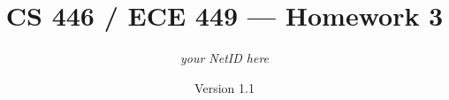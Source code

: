 \def\SPAN{\textup{span}}
\def\tu{\textup{u}}
\def\R{\mathbb{R}}
\def\E{\mathbb{E}}
\def\Z{\mathbb{Z}}
\def\be{\mathbf{e}}
\def\nf{\nabla f}
\def\veps{\varepsilon}
\def\cl{\textup{cl}}
\def\inte{\textup{int}}
\def\dom{\textup{dom}}
\def\Rad{\textup{Rad}}
\def\lsq{\ell_{\textup{sq}}}
\def\hcR{\widehat{\cR}}
\def\hcRl{\hcR_\ell}
\def\cRl{\cR_\ell}
\def\hcE{\widehat{\cE}}
\def\cEl{\cE_\ell}
\def\hcEl{\hcE_\ell}
\def\eps{\epsilon}
\def\1{\mathds{1}}
\newcommand{\red}[1]{{\color{red} #1}}
\newcommand{\blue}[1]{{\color{blue} #1}}
\def\srelu{\sigma_{\textup{r}}}
\def\vsrelu{\vec{\sigma_{\textup{r}}}}
\def\vol{\textup{vol}}
\def\sr{\sigma_r}
\usepackage{xcolor}

\newcommand{\PA}[1]{\textcolor{red}{PA: #1}}
\newcommand{\ip}[2]{\left\langle #1, #2 \right \rangle}
\newcommand{\mjt}[1]{{\color{blue}\emph\textbf{[M:}~#1~\textbf{]}}}

\newtheorem{fact}{Fact}
\newtheorem{lemma}{Lemma}
\newtheorem{claim}{Claim}
\newtheorem{proposition}{Proposition}
\newtheorem{theorem}{Theorem}
\newtheorem{corollary}{Corollary}
\newtheorem{condition}{Condition}
\theoremstyle{definition}
\newtheorem{definition}{Definition}
\theoremstyle{remark}
\newtheorem{remark}{Remark}
\newtheorem{example}{Example}







\newenvironment{Q}
{%
\clearpage
\item
}
{%
\phantom{s} %
\bigskip
\textbf{Solution.}
}











\title{CS 446 / ECE 449 --- Homework 3}
\author{\emph{your NetID here}}
\date{Version 1.1}






\maketitle

